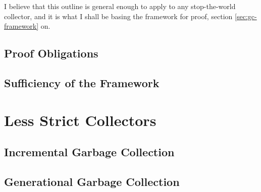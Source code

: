 I believe that this outline is general enough to apply to any
stop-the-world collector, and it is what I shall be basing the
framework for proof, section \ref{sec:gc-framework} on.

\subsection{Proof Obligations}
\label{sec:gc-framework-obligations}


\subsection{Sufficiency of the Framework}
\label{sec:gc-framework-sufficiency}


\section{Less Strict Collectors}
\label{sec:gc-lessstrict}


\subsection{Incremental Garbage Collection}
\label{sec:gc-lessstrict-incremental}


\subsection{Generational Garbage Collection}
\label{sec:gc-lessstrict-generational}

